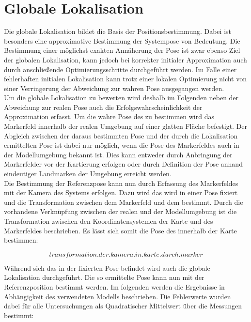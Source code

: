 \section{Globale Lokalisation}
Die globale Lokalisation bildet die Basis der Positionsbestimmung. Dabei ist besonders eine approximative Bestimmung der Systempose von Bedeutung. Die Bestimmung einer möglichst exakten Annäherung der Pose ist zwar ebenso Ziel der globalen Lokalisation, kann jedoch bei korrekter initialer Approximation auch durch anschließende Optimierungsschritte durchgeführt werden. Im Falle einer fehlerhaften initialen Lokalisation kann trotz einer lokalen Optimierung nicht von einer Verringerung der Abweichung zur wahren Pose ausgegangen werden.\\
Um die globale Lokalisation zu bewerten wird deshalb im Folgenden neben der Abweichung zur realen Pose auch die Erfolgswahrscheinlichkeit der Approximation erfasst. Um die wahre Pose des  zu bestimmen wird das Markerfeld innerhalb der realen Umgebung auf einer glatten Fläche befestigt. Der Abgleich zwischen der daraus bestimmten Pose und der durch die Lokalisation ermittelten Pose ist dabei nur möglich, wenn die Pose des Markerfeldes auch in der Modellumgebung bekannt ist. Dies kann entweder durch Anbringung der Markerfelder vor der Kartierung erfolgen oder durch Definition der Pose anhand eindeutiger Landmarken der Umgebung erreicht werden.\\
Die Bestimmung der Referenzpose kann nun durch Erfassung des Markerfeldes mit der Kamera des Systems erfolgen. Dazu wird das \kps{} wird in einer Pose fixiert und die Transformation zwischen dem Markerfeld und dem \kps{} bestimmt. Durch die vorhandene Verknüpfung zwischen der realen und der Modellumgebung ist die Transformation zwischen den Koordinatensystemen der Karte und des Markerfeldes beschrieben. Es lässt sich somit die Pose des  innerhalb der Karte bestimmen:

\begin{equation}
transformation.der.kamera.in.karte.durch.marker
\end{equation}

Während sich das \kps{} in der fixierten Pose befindet wird auch die globale Lokalisation durchgeführt. Die so ermittelte Pose kann nun mit der Referenzposition bestimmt werden. Im folgenden werden die Ergebnisse in Abhängigkeit des verwendeten Modells beschrieben. Die Fehlerwerte wurden dabei für alle Untersuchungen als Quadratischer Mittelwert über die Messungen bestimmt:

